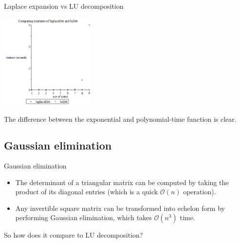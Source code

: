 \documentclass{beamer}
\begin{document}
\begin{frame}{Laplace expansion vs LU decomposition}

    \begin{center}{}
        \includegraphics[height=180]{laplace-lu}
    \end{center}

    The difference between the exponential and polynomial-time function is clear.
\end{frame}

\subsection{Gaussian elimination}

\begin{frame}{Gaussian elimination}

    \begin{itemize}

        \item The determinant of a triangular matrix can be computed by taking the product of its
            diagonal entries (which is a quick $\mathcal{O}(n)$ operation).

        \item Any invertible square matrix can be transformed into echelon form by performing
            Gaussian elimination, which takes $\mathcal{O}(n^3)$ time.

    \end{itemize}

    So how does it compare to LU decomposition?

\end{frame}
\end{document}
